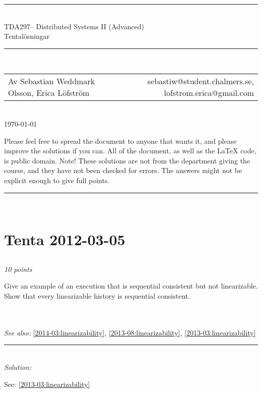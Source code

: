 \documentclass[a4paper]{article}
\makeatletter
\newcommand{\coursecode}{TDA297}
\newcommand{\coursename}{Distributed Systems II (Advanced)}
\newcommand{\authorname}{Sebastian Weddmark Olsson, Erica Löfström}
\newcommand{\authormail}{sebastiw@student.chalmers.se, lofstrom.erica@gmail.com}
\newcommand{\doctitle}{Tentalösningar}
\newcommand{\horrule}[1]{\rule{\linewidth}{#1}} %
\newcommand{\points}[1]{\subsection{} \textit{#1 points}\\}
\newcommand{\question}[2][]{
  \noindent
  \parbox[t]{\textwidth}{#1 \parbox[t]{0.95\textwidth}{#2}}\\
}
\newcommand{\seealso}[1]{\\\textit{See also:} #1}
\newcommand{\solution}[1]{\horrule{0.5pt}\\[3pt]\textit{Solution: }\\\begin{minipage}{\textwidth}#1\end{minipage}}
\makeatother
\begin{document}
\thispagestyle{plain} %
\begin{center}
\horrule{0.5pt} \\[0.3cm] %
%
\huge \coursecode -- \coursename \\[1mm]
\Large \doctitle \\
\normalsize %
\horrule{2pt} \\[0.1cm] %
\begin{tabular}{ l r }
Av \authorname & \authormail
\end{tabular}\\[0.1cm]
\footnotesize \today\\[0.4cm]
\end{center}
{\footnotesize
Please feel free to spread the document to anyone that wants it, and please improve the solutions if you can. All of the document, as well as the \LaTeX{} code, is public domain.
Note! These solutions are not from the department giving the course, and they have not been checked for errors. The answers might not be explicit enough to give full points.\\
}
\horrule{0.5pt} %
\normalsize %
\\[2.5cm]

\section{Tenta 2012-03-05}

\points{10}
\question{
  Give an example of an execution that is sequential consistent but
  not linearizable. \\
  Show that every linearizable history is sequential consistent.
}
\seealso{\ref{2014-03:linearizability}, \ref{2013-08:linearizability}, \ref{2013-03:linearizability}}
\solution{See: \ref{2013-03:linearizability}}
\end{document}
